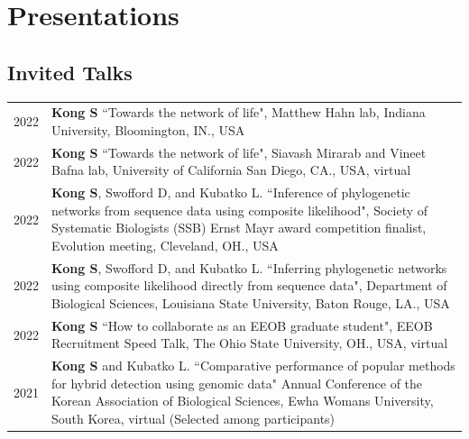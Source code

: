 \documentclass[11pt]{article}
\begin{document}











\section*{Presentations}

\subsection*{Invited Talks}

\begin{longtable}{p{}  p{}}

2022 & \textbf{Kong S} ``Towards the network of life",  Matthew Hahn lab, Indiana University, Bloomington, IN., USA\vspace{5pt}\\

2022 & \textbf{Kong S} ``Towards the network of life",  Siavash Mirarab and Vineet Bafna lab, University of California San Diego, CA., USA, virtual\vspace{5pt}\\

2022 & \textbf{Kong S}, Swofford D, and Kubatko L. ``Inference of phylogenetic networks from sequence data using composite likelihood",  Society of Systematic Biologists (SSB) Ernst Mayr award competition finalist, Evolution meeting, Cleveland, OH., USA\vspace{5pt}\\

2022 & \textbf{Kong S}, Swofford D, and Kubatko L. ``Inferring phylogenetic networks using composite likelihood directly from sequence data", Department of Biological Sciences, Louisiana State University, Baton Rouge, LA., USA\vspace{5pt}\\

2022 & \textbf{Kong S} ``How to collaborate as an EEOB graduate student", EEOB Recruitment Speed Talk, The Ohio State University, OH., USA, virtual \vspace{5pt} \\ 

2021 & \textbf{Kong S} and Kubatko L.  ``Comparative performance of popular methods for hybrid detection using genomic data" Annual Conference of the Korean Association of Biological Sciences, Ewha Womans University, South Korea, virtual (Selected among participants)\vspace{5pt}\\


\end{longtable}
\end{document}

